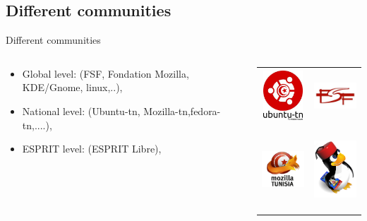 \documentclass[11pt,hyperref={pdfpagemode=FullScreen}]{beamer}
\begin{document}
\subsection{Different communities}
\begin{frame}{Different communities}
\begin{columns}
 
\begin{column}{0.6\textwidth}
\begin{itemize}
 \item \alert{Global level:}  (FSF, Fondation Mozilla, KDE/Gnome, linux,..),
 \item \alert{National level:} (Ubuntu-tn, Mozilla-tn,fedora-tn,....),
 \item \alert{ESPRIT level:} (ESPRIT Libre), 
\end{itemize}
\end{column}

\begin{column}{0.4\textwidth}
\begin{tabular}{c c}
 \includegraphics[width=1.5cm,height=2cm]{utn} & \includegraphics[width=2cm,height=1cm]{fsf}\\
 \includegraphics[width=2cm,height=3cm]{mtn} &\includegraphics[width=2cm,height=3cm]{final}\\
\end{tabular} 
  
\end{column}


\end{columns}

 
\end{frame}
\end{document}

